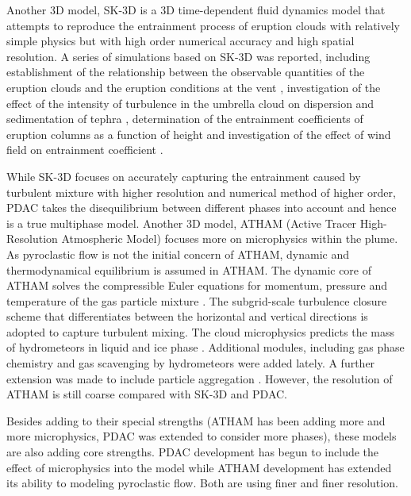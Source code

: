 \documentclass[gmd, manuscript]{copernicus}
\begin{document}
Another 3D model, SK-3D \citep{suzuki2005numerical} is a 3D time-dependent fluid dynamics model that attempts to reproduce the entrainment process of eruption clouds with relatively simple physics but with high order numerical accuracy and high spatial resolution.
A series of simulations based on SK-3D was reported, including establishment of the relationship between the observable quantities of the eruption clouds and the eruption conditions at the vent \citep{suzuki2009three}, investigation of the effect of the intensity of turbulence in the umbrella cloud on dispersion and sedimentation of tephra \citep{koyaguchi2009effect}, determination of the entrainment coefficients of eruption columns as a function of height \citep{suzuki2010numerical} and investigation of the effect of wind field on entrainment coefficient \citep{suzuki20133d}. 

While SK-3D focuses on accurately capturing the entrainment caused by turbulent mixture with higher resolution and numerical method of higher order, PDAC takes the disequilibrium between different phases into account and hence is a true multiphase model. Another 3D model, ATHAM (Active Tracer High-Resolution Atmospheric Model) \citep{oberhuber1998volcanic} focuses more on microphysics within the plume. As pyroclastic flow is not the initial concern of ATHAM, dynamic and thermodynamical equilibrium is assumed in ATHAM. The dynamic core of ATHAM solves the compressible Euler equations for momentum, pressure and temperature of the gas particle mixture \citep{oberhuber1998volcanic}. The subgrid-scale turbulence closure scheme that differentiates between the horizontal and vertical directions \citep{herzog2003prognostic} is adopted to capture turbulent mixing. The cloud microphysics predicts the mass of hydrometeors in liquid and ice phase \citep{herzog1998effect}. Additional modules, including gas phase chemistry \citep{trentmann2002simulation} and gas scavenging by hydrometeors \citep{textor2003injection} were added lately. A further extension was made to include particle aggregation \citep{textor2006volcanic1, textor2006volcanic2}. However, the resolution of ATHAM is still coarse compared with SK-3D and PDAC.

Besides adding to their special strengths (ATHAM has been adding more and more microphysics, PDAC was extended to consider more phases), these models are also adding core strengths. PDAC development has begun to include the effect of microphysics into the model while ATHAM development has extended its ability to modeling pyroclastic flow. Both are using finer and finer resolution. 
\end{document}
